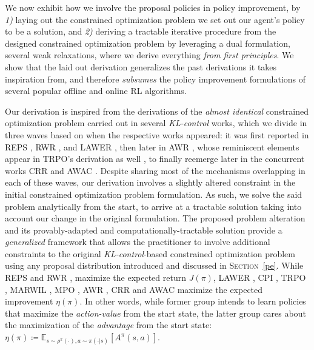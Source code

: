 We now exhibit how we involve the proposal policies in policy improvement, by
\textit{1)} laying out the constrained optimization problem we set out our agent's policy to be a solution, and
\textit{2)} deriving a tractable iterative procedure from the designed constrained optimization problem by
leveraging a dual formulation, several weak relaxations, where we derive everything \emph{from first principles}.
We show that the laid out derivation generalizes the past derivations it takes inspiration from, and therefore
\emph{subsumes} the policy improvement formulations of several popular offline and online RL algorithms.

Our derivation is inspired from the derivations of the \textit{almost identical} constrained optimization problem
carried out in several \textit{KL-control} works, which we divide in three waves based on when
the respective works appeared:
it was first reported in REPS \cite{Peters2010-vd},
RWR \cite{Peters2007-qb, Kober2010-hy},
and LAWER \cite{Neumann2008-tm},
then later in AWR \cite{Peng2019-hu},
whose reminiscent elements appear in TRPO's derivation as well \cite{Schulman2015-jt},
to finally reemerge later in the concurrent works CRR \cite{Wang2020-sr}
and AWAC \cite{Nair2020-gd}.
Despite sharing most of the mechanisms overlapping in each of these waves,
our derivation involves a slightly altered constraint in the initial constrained optimization problem
formulation. As such, we solve the said problem analytically from the start, to arrive at a tractable solution
taking into account our change in the original formulation. The proposed problem alteration and its provably-adapted
and computationally-tractable solution provide a \emph{generalized} framework that allows the practitioner
to involve additional constraints to the original \textit{KL-control}-based constrained optimization problem
using any proposal distribution introduced and discussed in \textsc{Section}~\ref{pe}.
While REPS \cite{Peters2010-vd}
and RWR \cite{Peters2007-qb, Kober2010-hy},
maximize the expected return $J(\pi)$,
LAWER \cite{Neumann2008-tm},
CPI \cite{Kakade2002-kw},
TRPO \cite{Schulman2015-jt},
MARWIL \cite{Wang2018-dn},
MPO \cite{Abdolmaleki2018-sp},
AWR \cite{Peng2019-hu},
CRR \cite{Wang2020-sr}
and AWAC \cite{Nair2020-gd}
maximize the expected improvement $\eta(\pi)$.
In other words, while former group intends to learn policies that maximize the \emph{action-value}
from the start state, the latter group cares about the maximization of the \emph{advantage} from the start state:
$\eta(\pi) \coloneqq \mathbb{E}_{s \sim \rho^\pi(\cdot), a \sim \pi(\cdot | s)}[A^\pi(s,a)]$.

